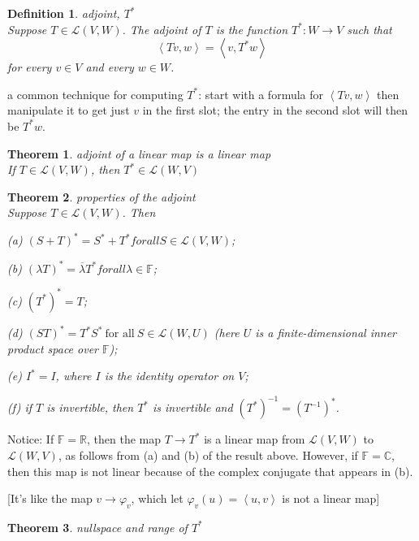 \documentclass{article}
\newtheorem{theorem}{Theorem}[subsection]
\newtheorem{definition}{Definition}[subsection]
\newcommand{\RR}{\mathbb{R}}
\newcommand{\CC}{\mathbb{C}}
\newcommand{\FF}{\mathbb{F}}
\begin{document}
\begin{CJK}{UTF8}{gkai}
\begin{definition}
    adjoint, $T^\ast$\\

    Suppose $T \in \mathcal{L}(V,W)$. The adjoint of $T$ is the function $T^\ast: W \to V$ such that
    \[\left<Tv,w\right> = \left<v,T^\ast w\right>\]
    for every $v \in V$ and every $w \in W$.
\end{definition}

a common technique for computing $T^\ast$: start with a formula for $\left<Tv,w\right>$ then manipulate it to get just $v$ in the first slot; the entry in the second slot will then be $T^\ast w$.\\

\begin{theorem}
    adjoint of a linear map is a linear map\\

    If $T \in \mathcal{L}(V,W)$, then $T^\ast \in \mathcal{L}(W,V)$
\end{theorem}

\begin{theorem}
    properties of the adjoint\\

    Suppose $T \in \mathcal{L}(V,W)$. Then

    (a) $(S +T)^\ast = S^\ast +T^\ast for all S \in \mathcal{L}(V,W)$;

    (b) $(\lambda T)^\ast = \overline{\lambda} T^\ast for all \lambda  \in \FF$;

    (c) $(T^\ast)^\ast = T$;

    (d) $(ST)^\ast = T^\ast S^\ast ~\text{for all}~ S \in \mathcal{L}(W,U)$ (here $U$ is a finite-dimensional inner product space over $\FF$);

    (e) $I^\ast = I$, where $I$ is the identity operator on $V$;

    (f) if $T$ is invertible, then $T^\ast$ is invertible and $(T^\ast)^{-1} = (T^{-1})^\ast$.
\end{theorem}

Notice: If $\FF = \RR$, then the map $T \to T^\ast$ is a linear map from $\mathcal{L}(V,W)$ to $\mathcal{L}(W,V)$, as follows from (a) and (b) of the result above. However, if $\FF = \CC$, then this map
is not linear because of the complex conjugate that appears in (b).

[It's like the map $v \to \varphi_v$, which let $\varphi_v(u) = \left<u,v\right>$ is not a linear map]

\begin{theorem}
    nullspace and range of $T^\ast$\\


\end{theorem}
\end{CJK}
\end{document}
